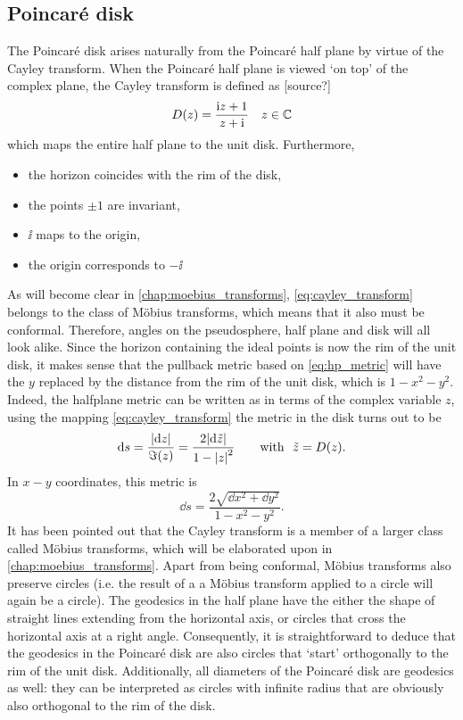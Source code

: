 \subsection{Poincaré disk}
The Poincaré disk arises naturally from the Poincaré half plane by virtue of the Cayley transform. When the Poincaré half plane is viewed `on top' of the complex plane, the Cayley transform is defined as [source?]
\begin{equation}
    D(z) = \frac{\mathrm{i} z + 1}{z + \mathrm{i}}\quad z \in \mathbb{C}
    \label{eq:cayley_transform}
\end{equation}
which maps the entire half plane to the unit disk. Furthermore, 
\begin{itemize}
    \item the horizon coincides with the rim of the disk,
    \item the points \(\pm1\) are invariant,
    \item \(\ii\) maps to the origin, 
    \item the origin corresponds to \(-\ii\)
\end{itemize}
As will become clear in \cref{chap:moebius_transforms}, \cref{eq:cayley_transform} belongs to the class of Möbius transforms, which means that it also must be conformal. Therefore, angles on the pseudosphere, half plane and disk will all look alike. Since the horizon containing the ideal points is now the rim of the unit disk, it makes sense that the pullback metric based on \cref{eq:hp_metric} will have the $y$ replaced by the distance from the rim of the unit disk, which is $1 - x^2 - y^2$. Indeed, the halfplane metric can be written as in terms of the complex variable $z$, using the mapping \cref{eq:cayley_transform} the metric in the disk turns out to be \cite{Needham1997}
\[
    \dd{s} = \frac{\abs{\dd{z}}}{\imaginary(z)} = \frac{2\abs{\dd{\tilde{z}}}}{1 - \abs{z}^2} \qquad \text{with }\ \tilde{z} = D(z).
\]
In \(x-y\) coordinates, this metric is
\begin{equation}
    \dd{s} = \frac{2\sqrt{\dd{x}^2 + \dd{y}^2}}{1 - x^2 - y^2}.
\end{equation}
It has been pointed out that the Cayley transform is a member of a larger class called Möbius transforms, which will be elaborated upon in \cref{chap:moebius_transforms}. Apart from being conformal, Möbius transforms also preserve circles (i.e. the result of a a Möbius transform applied to a circle will again be a circle). The geodesics in the half plane have the either the shape of straight lines extending from the horizontal axis, or circles that cross the horizontal axis at a right angle. Consequently, it is straightforward to deduce that the geodesics in the Poincaré disk are also circles that `start' orthogonally to the rim of the unit disk. Additionally, all diameters of the Poincaré disk are geodesics as well: they can be interpreted as circles with infinite radius that are obviously also orthogonal to the rim of the disk.

